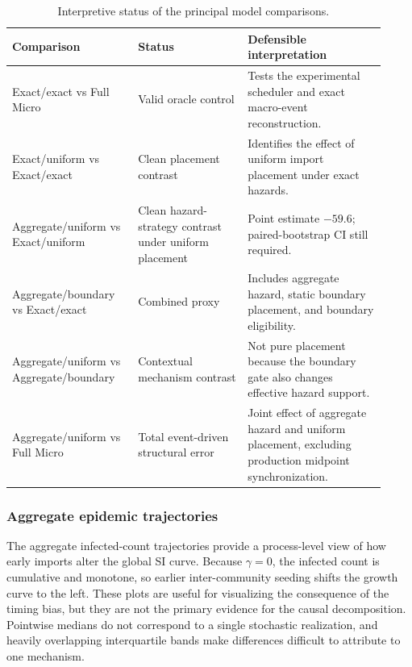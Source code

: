 \begin{table}[t]
\centering
\small
\begin{tabular}{p{0.31\linewidth}p{0.27\linewidth}p{0.34\linewidth}}
\toprule
Comparison & Status & Defensible interpretation \\
\midrule
Exact/exact vs Full Micro
& Valid oracle control
& Tests the experimental scheduler and exact macro-event reconstruction. \\

Exact/uniform vs Exact/exact
& Clean placement contrast
& Identifies the effect of uniform import placement under exact hazards. \\

Aggregate/uniform vs Exact/uniform
& Clean hazard-strategy contrast under uniform placement
& Point estimate $-59.6$; paired-bootstrap CI still required. \\

Aggregate/boundary vs Exact/exact
& Combined proxy
& Includes aggregate hazard, static boundary placement, and boundary eligibility. \\

Aggregate/uniform vs Aggregate/boundary
& Contextual mechanism contrast
& Not pure placement because the boundary gate also changes effective hazard support. \\

Aggregate/uniform vs Full Micro
& Total event-driven structural error
& Joint effect of aggregate hazard and uniform placement, excluding production midpoint synchronization. \\
\bottomrule
\end{tabular}
\caption{Interpretive status of the principal model comparisons.}
\label{tab:hazard_placement_interpretation}
\end{table}

\subsubsection{Aggregate epidemic trajectories}
\label{sec:hazard_placement_infected_dynamics}

The aggregate infected-count trajectories provide a process-level view of how early imports alter the global SI curve.  Because $\gamma=0$, the infected count is cumulative and monotone, so earlier inter-community seeding shifts the growth curve to the left.  These plots are useful for visualizing the consequence of the timing bias, but they are not the primary evidence for the causal decomposition.  Pointwise medians do not correspond to a single stochastic realization, and heavily overlapping interquartile bands make differences difficult to attribute to one mechanism.

